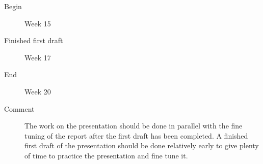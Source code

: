 \documentclass[a4paper,11pt]{report}
\begin{document}
\begin{description}
        \begin{description}
            \item[Begin] Week 15
            \item[Finished first draft] Week 17
            \item[End] Week 20
            \item[Comment] The work on the presentation should be done in
                parallel with the fine tuning of the report after the first 
                draft has been completed. A finished first draft of the 
                presentation should be done relatively early to give plenty
                of time to practice the presentation and fine tune it.
        \end{description}
\end{description}

{}

\end{document}
